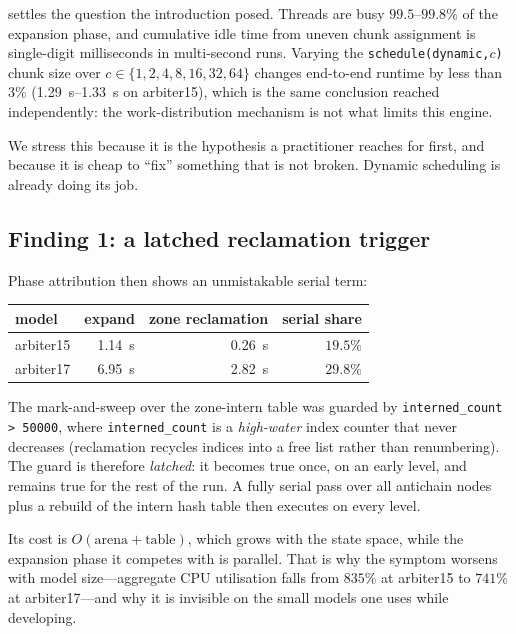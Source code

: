  settles the question the introduction posed.  Threads are
busy $99.5$--$99.8\%$ of the expansion phase, and cumulative idle time from
uneven chunk assignment is single-digit milliseconds in multi-second runs.
Varying the \texttt{schedule(dynamic,$c$)} chunk size over
$c \in \{1,2,4,8,16,32,64\}$ changes end-to-end runtime by less than $3\%$
(\SIrange{1.29}{1.33}{\second} on arbiter15), which is the same conclusion
reached independently: the work-distribution mechanism is not what limits this
engine.

We stress this because it is the hypothesis a practitioner reaches for first,
and because it is cheap to ``fix'' something that is not broken.  Dynamic
scheduling is already doing its job.

\subsection{Finding 1: a latched reclamation trigger}

Phase attribution then shows an unmistakable serial term:

\begin{center}
\begin{tabular}{lrrr}
\toprule
model & expand & zone reclamation & serial share \\
\midrule
arbiter15 & \SI{1.14}{\second} & \SI{0.26}{\second} & $19.5\%$ \\
arbiter17 & \SI{6.95}{\second} & \SI{2.82}{\second} & $29.8\%$ \\
\bottomrule
\end{tabular}
\end{center}

The mark-and-sweep over the zone-intern table was guarded by
\texttt{interned\_count > 50000}, where \texttt{interned\_count} is a
\emph{high-water} index counter that never decreases (reclamation recycles
indices into a free list rather than renumbering).  The guard is therefore
\emph{latched}: it becomes true once, on an early level, and remains true for
the rest of the run.  A fully serial pass over all antichain nodes plus a
rebuild of the intern hash table then executes on every level.

Its cost is $O(\text{arena} + \text{table})$, which grows with the state space,
while the expansion phase it competes with is parallel.  That is why the
symptom worsens with model size---aggregate CPU utilisation falls from $835\%$
at arbiter15 to $741\%$ at arbiter17---and why it is invisible on the small
models one uses while developing.

